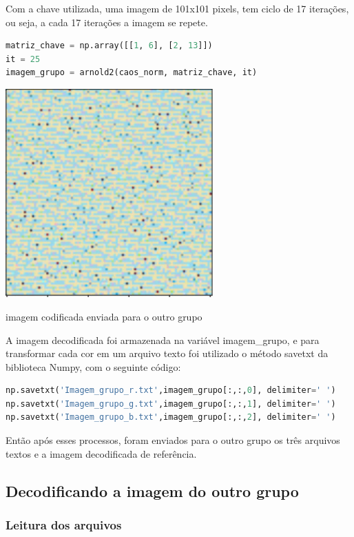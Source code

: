 \documentclass[a4paper, 12pt]{article}
\begin{document}
Com a chave utilizada, uma imagem de 101x101 pixels, tem ciclo de 17 iterações, ou seja, a cada 17 iterações a imagem se repete.

\begin{lstlisting}[language=Python, caption=Imagem Codificada]
matriz_chave = np.array([[1, 6], [2, 13]])
it = 25
imagem_grupo = arnold2(caos_norm, matriz_chave, it)
\end{lstlisting}

\begin{center}
    \includegraphics[width=8cm]{imagem_grupo.jpg}
    
    imagem codificada enviada para o outro grupo
\end{center}
A imagem decodificada foi armazenada na variável imagem\_grupo, e para transformar cada cor em um arquivo texto foi utilizado o método savetxt da biblioteca Numpy, com o seguinte código:

\begin{lstlisting}[language=Python, caption=imagem codificada para texto]
np.savetxt('Imagem_grupo_r.txt',imagem_grupo[:,:,0], delimiter=' ')
np.savetxt('Imagem_grupo_g.txt',imagem_grupo[:,:,1], delimiter=' ')
np.savetxt('Imagem_grupo_b.txt',imagem_grupo[:,:,2], delimiter=' ')
\end{lstlisting}

Então após esses processos, foram enviados para o outro grupo os três arquivos textos e a imagem decodificada de referência.

\subsection{Decodificando a imagem do outro grupo}


\subsubsection{Leitura dos arquivos}
\end{document}
